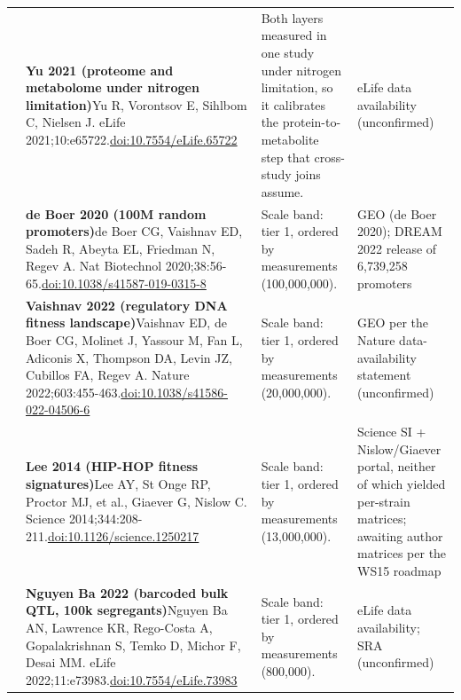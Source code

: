 \begin{landscape}
\begin{longtable}{@{}r@{\hspace{4pt}} L{86mm} L{92mm} L{62mm}@{}}
 & \textbf{Yu 2021 (proteome and metabolome under nitrogen limitation)}\newline Yu R, Vorontsov E, Sihlbom C, Nielsen J. eLife 2021;10:e65722.\newline \href{https://doi.org/10.7554/eLife.65722}{doi:10.7554/\allowbreak eLife.65722} & Both layers measured in one study under nitrogen limitation, so it calibrates the protein-to-metabolite step that cross-study joins assume. & eLife data availability (unconfirmed) \\
 & \textbf{de Boer 2020 (100M random promoters)}\newline de Boer CG, Vaishnav ED, Sadeh R, Abeyta EL, Friedman N, Regev A. Nat Biotechnol 2020;38:56-65.\newline \href{https://doi.org/10.1038/s41587-019-0315-8}{doi:10.1038/\allowbreak s41587-019-0315-8} & Scale band: tier 1, ordered by measurements (100,000,000). & GEO (de Boer 2020); DREAM 2022 release of 6,739,258 promoters \\
 & \textbf{Vaishnav 2022 (regulatory DNA fitness landscape)}\newline Vaishnav ED, de Boer CG, Molinet J, Yassour M, Fan L, Adiconis X, Thompson DA, Levin JZ, Cubillos FA, Regev A. Nature 2022;603:455-463.\newline \href{https://doi.org/10.1038/s41586-022-04506-6}{doi:10.1038/\allowbreak s41586-022-04506-6} & Scale band: tier 1, ordered by measurements (20,000,000). & GEO per the Nature data-availability statement (unconfirmed) \\
 & \textbf{Lee 2014 (HIP-HOP fitness signatures)}\newline Lee AY, St Onge RP, Proctor MJ, et al., Giaever G, Nislow C. Science 2014;344:208-211.\newline \href{https://doi.org/10.1126/science.1250217}{doi:10.1126/\allowbreak science.1250217} & Scale band: tier 1, ordered by measurements (13,000,000). & Science SI + Nislow/\allowbreak Giaever portal, neither of which yielded per-strain matrices; awaiting author matrices per the WS15 roadmap \\
 & \textbf{Nguyen Ba 2022 (barcoded bulk QTL, 100k segregants)}\newline Nguyen Ba AN, Lawrence KR, Rego-Costa A, Gopalakrishnan S, Temko D, Michor F, Desai MM. eLife 2022;11:e73983.\newline \href{https://doi.org/10.7554/eLife.73983}{doi:10.7554/\allowbreak eLife.73983} & Scale band: tier 1, ordered by measurements (800,000). & eLife data availability; SRA (unconfirmed) \\

\end{longtable}
\end{landscape}
